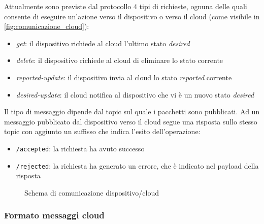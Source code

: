 \documentclass[12pt,a4paper,twoside,titlepage]{book}
\begin{document}
Attualmente sono previste dal protocollo 4 tipi di richieste, ognuna delle quali consente di eseguire un'azione verso 
il dispositivo o verso il \gls{cloud} (come visibile in \autoref{fig:comunicazione_cloud}):

\begin{itemize}
    \item \textit{get}: il dispositivo richiede al \gls{cloud} l'ultimo stato \textit{desired}
    \item \textit{delete}: il dispositivo richiede al \gls{cloud} di eliminare lo stato corrente
    \item \textit{reported-update}: il dispositivo invia al \gls{cloud} lo stato \textit{reported} corrente
    \item \textit{desired-update}: il \gls{cloud} notifica al dispositivo che vi è un nuovo stato \textit{desired}
\end{itemize}

Il tipo di messaggio dipende dal \gls{topic} sul quale i pacchetti sono pubblicati. Ad
un messaggio pubblicato dal dispositivo verso il \gls{cloud} segue una risposta sullo stesso \gls{topic}
con aggiunto un suffisso che indica l'esito dell'operazione:
\begin{itemize}
    \item \texttt{/accepted}: la richiesta ha avuto successo
    \item \texttt{/rejected}: la richiesta ha generato un errore, che è indicato nel payload della risposta
\end{itemize}

\begin{figure}[ht]
    \centering
    \caption{Schema di comunicazione dispositivo/cloud}
    \label{fig:comunicazione_cloud}
\end{figure}

\subsubsection{Formato messaggi cloud}
\end{document}
